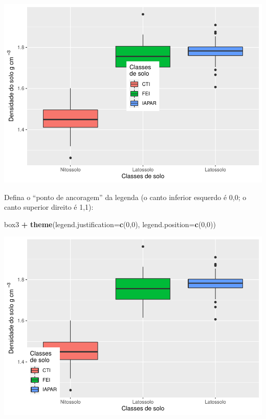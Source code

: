 \documentclass[
]{book}
\newenvironment{Shaded}{\begin{snugshade}}{\end{snugshade}}
\newcommand{\DataTypeTok}[1]{\textcolor[rgb]{0.13,0.29,0.53}{#1}}
\newcommand{\DecValTok}[1]{\textcolor[rgb]{0.00,0.00,0.81}{#1}}
\newcommand{\KeywordTok}[1]{\textcolor[rgb]{0.13,0.29,0.53}{\textbf{#1}}}
\newcommand{\NormalTok}[1]{#1}
\newcommand{\OperatorTok}[1]{\textcolor[rgb]{0.81,0.36,0.00}{\textbf{#1}}}
\newcommand{\StringTok}[1]{\textcolor[rgb]{0.31,0.60,0.02}{#1}}
\begin{document}
\includegraphics{TudodoR_files/figure-latex/unnamed-chunk-216-1.pdf}

Defina o ``ponto de ancoragem'' da legenda (o canto inferior esquerdo é 0,0; o canto superior direito é 1,1):

\begin{Shaded}
\begin{Highlighting}[]
\NormalTok{box3 }\OperatorTok{+}\StringTok{ }\KeywordTok{theme}\NormalTok{(}\DataTypeTok{legend.justification=}\KeywordTok{c}\NormalTok{(}\DecValTok{0}\NormalTok{,}\DecValTok{0}\NormalTok{), }\DataTypeTok{legend.position=}\KeywordTok{c}\NormalTok{(}\DecValTok{0}\NormalTok{,}\DecValTok{0}\NormalTok{))}
\end{Highlighting}
\end{Shaded}

\includegraphics{TudodoR_files/figure-latex/unnamed-chunk-217-1.pdf}
\end{document}
